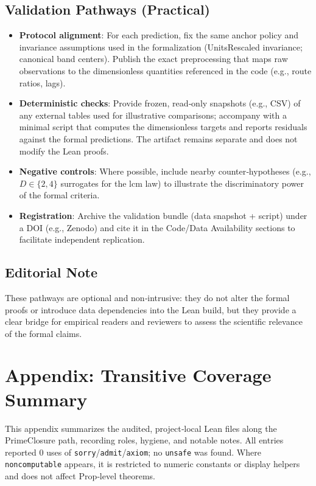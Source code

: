 \documentclass{article}
\begin{document}
\subsection{Validation Pathways (Practical)}
\begin{itemize}[leftmargin=*]
  \item \textbf{Protocol alignment}: For each prediction, fix the same anchor policy and invariance assumptions used in the formalization (UnitsRescaled invariance; canonical band centers). Publish the exact preprocessing that maps raw observations to the dimensionless quantities referenced in the code (e.g., route ratios, lags).
  \item \textbf{Deterministic checks}: Provide frozen, read‑only snapshots (e.g., CSV) of any external tables used for illustrative comparisons; accompany with a minimal script that computes the dimensionless targets and reports residuals against the formal predictions. The artifact remains separate and does not modify the Lean proofs.
  \item \textbf{Negative controls}: Where possible, include nearby counter‑hypotheses (e.g., \(D\in\{2,4\}\) surrogates for the lcm law) to illustrate the discriminatory power of the formal criteria.
  \item \textbf{Registration}: Archive the validation bundle (data snapshot + script) under a DOI (e.g., Zenodo) and cite it in the Code/Data Availability sections to facilitate independent replication.
\end{itemize}

\subsection{Editorial Note}
These pathways are optional and non‑intrusive: they do not alter the formal proofs or introduce data dependencies into the Lean build, but they provide a clear bridge for empirical readers and reviewers to assess the scientific relevance of the formal claims.

\section{Appendix: Transitive Coverage Summary}
This appendix summarizes the audited, project‑local Lean files along the PrimeClosure path, recording roles, hygiene, and notable notes. All entries reported 0 uses of \texttt{sorry}/\texttt{admit}/\texttt{axiom}; no \texttt{unsafe} was found. Where \texttt{noncomputable} appears, it is restricted to numeric constants or display helpers and does not affect Prop‑level theorems.
\end{document}

